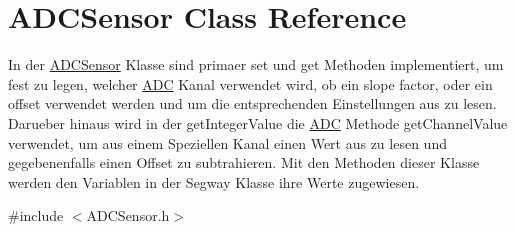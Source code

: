 \hypertarget{class_a_d_c_sensor}{}\section{A\+D\+C\+Sensor Class Reference}
\label{class_a_d_c_sensor}


In der \hyperlink{class_a_d_c_sensor}{A\+D\+C\+Sensor} Klasse sind primaer set und get Methoden implementiert, um fest zu legen, welcher \hyperlink{class_a_d_c}{A\+D\+C} Kanal verwendet wird, ob ein slope factor, oder ein offset verwendet werden und um die entsprechenden Einstellungen aus zu lesen. Darueber hinaus wird in der get\+Integer\+Value die \hyperlink{class_a_d_c}{A\+D\+C} Methode get\+Channel\+Value verwendet, um aus einem Speziellen Kanal einen Wert aus zu lesen und gegebenenfalls einen Offset zu subtrahieren. Mit den Methoden dieser Klasse werden den Variablen in der Segway Klasse ihre Werte zugewiesen.  




{\ttfamily \#include $<$A\+D\+C\+Sensor.\+h$>$}

